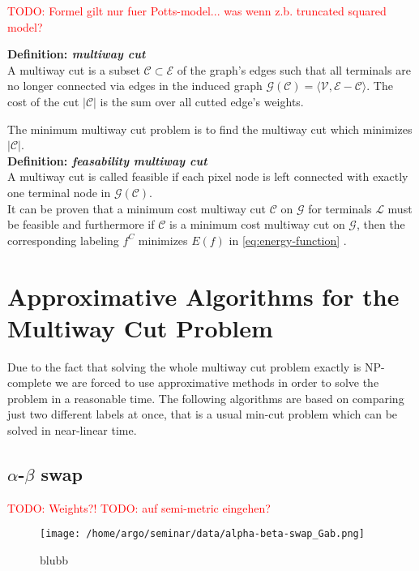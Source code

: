 \documentclass{scrartcl}[12pt, halfparskip]
\newcommand{\todo}[1]{\textcolor{red}{TODO: #1}}
\begin{document}
\todo{Formel gilt nur fuer Potts-model... was wenn z.b. truncated squared model?}

\textbf{Definition: \textit{multiway cut}}\\
A multiway cut is a subset $\mathcal{C} \subset \mathcal{E}$ of the graph's edges such that all terminals are no longer connected via edges in the induced graph $\mathcal{G}(\mathcal{C}) = \langle \mathcal{V}, \mathcal{E} - \mathcal{C}\rangle$. The cost of the cut $|\mathcal{C}|$ is the sum over all cutted edge's weights. 

The minimum multiway cut problem is to find the multiway cut which minimizes $|\mathcal{C}|$. \\

\textbf{Definition: \textit{feasability multiway cut}}\\
A multiway cut is called feasible if each pixel node is left connected with exactly one terminal node in $\mathcal{G}(\mathcal{C})$. \\


It can be proven that a minimum cost multiway cut $\mathcal{C}$ on $\mathcal{G}$ for terminals $\mathcal{L}$ must be feasible \cite{boykov98} and furthermore if $\mathcal{C}$ is a minimum cost multiway cut on $\mathcal{G}$, then the corresponding labeling $f^C$ minimizes $E(f)$ in \eqref{eq:energy-function} \cite{boykov98}.





\section{Approximative Algorithms for the Multiway Cut Problem}
Due to the fact that solving the whole multiway cut problem exactly is NP-complete we are forced to use approximative methods in order to solve the problem in a reasonable time.
The following algorithms are based on comparing just two different labels at once, that is a usual min-cut problem which can be solved in near-linear time.


\subsection{$\alpha$-$\beta$ swap}

\todo{Weights?!}
\todo{auf semi-metric eingehen?}

\begin{wrapfigure}{r}{0.5\textwidth} 
	\vspace{-1.5cm}
	\texttt{[image: /home/argo/seminar/data/alpha-beta-swap\_Gab.png]}
	\caption{blubb}
	\label{fig:alpha-beta-swap_Gab}
\end{wrapfigure}
\end{document}

